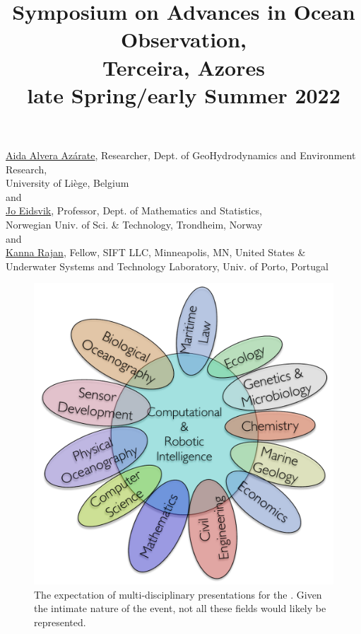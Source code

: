 \documentclass[10pt,letterpaper]{article}
\title{Symposium on Advances in Ocean Observation,\\
  Terceira, Azores \\ \large{\textbf{late Spring/early Summer 2022}}}
\date{}
\begin{document}
\maketitle{}

\vspace{-1.75cm}
\begin{center}
  \href{http://modb.oce.ulg.ac.be/mediawiki/index.php/User:Aida}{\textsf{Aida Alvera Az\'{a}rate}},
  Researcher, Dept. of GeoHydrodynamics and Environment Research,\\
  University of Li\`{e}ge, Belgium\\
  and\\
  \href{https://www.ntnu.edu/employees/jo.eidsvik}{\textsf{Jo Eidsvik}},
  Professor, Dept. of Mathematics and Statistics, \\Norwegian Univ. of
  Sci. \& Technology, Trondheim, Norway\\
  and\\
  \href{https://kanna.rajan.systems}{\textsf{Kanna Rajan}},
  Fellow, SIFT LLC, Minneapolis, MN, United States \& \\Underwater Systems and Technology
  Laboratory, Univ. of Porto, Portugal
\end{center}

\begin{figure}
  \vspace{-0.5cm}
  \centering 
  \includegraphics[scale=0.4]{fig/disciplines.pdf}
  \caption{The expectation of multi-disciplinary presentations for the
    \sympe. Given the intimate nature of the event, not all these
    fields would likely be represented.}
  \label{fig:concept}
  \vspace{-0.5cm}
\end{figure}
\end{document}
